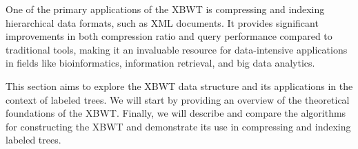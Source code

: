 \begin{comment}
\draft{As explained in \cref{sec:state-of-the-art}, the XBWT works by linearizing a labeled tree into two coordinated arrays, one capturing the structural properties of the tree and the other storing its labels. The key advantage of the XBWT lies in its ability to compress labeled trees while supporting a wide range of operations, such as navigation, visualization and subpath queries (see \cref{def:tree_operations}), within (near-)optimal time bounds and entropy-bounded space.} \alessio{This is basically the same paragraph of the SOTA, is it necessary to keep it here? It will be explained in detail anyways in the next subsection.}
\end{comment}

One of the primary applications of the XBWT is compressing and indexing hierarchical data formats, such as XML documents. It provides significant improvements in both compression ratio and query performance compared to traditional tools, making it an invaluable resource for data-intensive applications in fields like bioinformatics, information retrieval, and big data analytics.

This section aims to explore the XBWT data structure and its applications in the context of labeled trees. We will start by providing an overview of the theoretical foundations of the XBWT. Finally, we will describe and compare the algorithms for constructing the XBWT and demonstrate its use in compressing and indexing labeled trees.

\begin{comment}
\subsection{How it Works}
The transformation process of the XBWT is as follows:
\begin{enumerate}
    \item \textbf{Path Sorting:} The labeled tree is linearized by sorting its nodes based on the \emph{paths} from each node's parent to the root. The resulting order groups nodes with similar upward paths together, clustering related labels.
    \item \textbf{Array Construction:} Two arrays, \( S_{\text{last}} \) and \( S_{\alpha} \), are generated:
    \begin{itemize}
        \item \( S_{\text{last}} \) stores structural information, such as whether a node is the last child of its parent. This encodes the tree structure without the need for explicit pointers.
        \item \( S_{\alpha} \) stores the labels of the nodes in the sorted order determined by their upward-path sorting.
    \end{itemize}
    \item \textbf{Compression:} Both \( S_{\text{last}} \) and \( S_{\alpha} \) are highly compressible due to the clustering of similar labels and structural redundancy.
\end{enumerate}
\end{comment}

